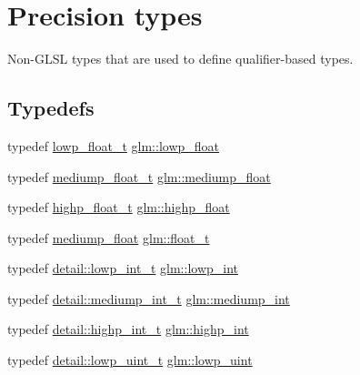 \hypertarget{group__core__precision}{}\section{Precision types}
\label{group__core__precision}


Non-\/\+G\+L\+SL types that are used to define qualifier-\/based types.  


\subsection*{Typedefs}
\begin{DoxyCompactItemize}
\item 
typedef \mbox{\hyperlink{namespaceglm_a0a43b64238afac063f27ee7620205bf2}{lowp\+\_\+float\+\_\+t}} \mbox{\hyperlink{group__core__precision_ga2887fbc729ac5c1c5caeb7cd57a7145c}{glm\+::lowp\+\_\+float}}
\item 
typedef \mbox{\hyperlink{namespaceglm_aec127979a2b6edbf05b485cb4e8c47cc}{mediump\+\_\+float\+\_\+t}} \mbox{\hyperlink{group__core__precision_gac785826c039fe6c97c03b37c81c1a68e}{glm\+::mediump\+\_\+float}}
\item 
typedef \mbox{\hyperlink{namespaceglm_af6f4e45ae06ae3f979dd30cafe7d07c6}{highp\+\_\+float\+\_\+t}} \mbox{\hyperlink{group__core__precision_ga3d443a093adc053638ed7f81c5bfe300}{glm\+::highp\+\_\+float}}
\item 
typedef \mbox{\hyperlink{group__core__precision_gac785826c039fe6c97c03b37c81c1a68e}{mediump\+\_\+float}} \mbox{\hyperlink{group__core__precision_gae01b87f81bd15327230bf1b47c482b24}{glm\+::float\+\_\+t}}
\item 
typedef \mbox{\hyperlink{namespaceglm_1_1detail_a030a8128e369fc1f9c7982dc68a78ba7}{detail\+::lowp\+\_\+int\+\_\+t}} \mbox{\hyperlink{group__core__precision_ga4681244bf4a184734f03aa9df4e3d288}{glm\+::lowp\+\_\+int}}
\item 
typedef \mbox{\hyperlink{namespaceglm_1_1detail_aede0757f19204d1d44f716b3dd66d13c}{detail\+::mediump\+\_\+int\+\_\+t}} \mbox{\hyperlink{group__core__precision_ga2a3dcbcd7f4e17663d393a12061ac6ac}{glm\+::mediump\+\_\+int}}
\item 
typedef \mbox{\hyperlink{namespaceglm_1_1detail_a74c48e9deafcc33db998a4ee62da8d6e}{detail\+::highp\+\_\+int\+\_\+t}} \mbox{\hyperlink{group__core__precision_gaafed5240eb0a43328cb75faf5fb0a8c2}{glm\+::highp\+\_\+int}}
\item 
typedef \mbox{\hyperlink{namespaceglm_1_1detail_ad59c4581ad8ce0c3ef6146edaa7e15dc}{detail\+::lowp\+\_\+uint\+\_\+t}} \mbox{\hyperlink{group__core__precision_ga8077c90f2c87e419ea6c273157dcc1fc}{glm\+::lowp\+\_\+uint}}

\end{DoxyCompactItemize}
